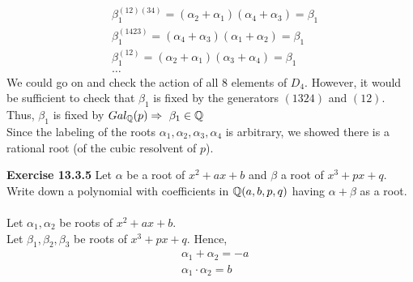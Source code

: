 \documentclass{article}
\begin{document}
\begin{homeworkProblem}
\begin{align}
    & \beta_1^{(12)(34)} = (\alpha_2+\alpha_1)(\alpha_4+\alpha_3) = \beta_1\\
    & \beta_1^{(1423)} = (\alpha_4+\alpha_3)(\alpha_1+\alpha_2)=\beta_1\\
    & \beta_1^{(12)} = (\alpha_2+\alpha_1)(\alpha_3+\alpha_4) = \beta_1\\
    & \ldots 
\end{align}
We could go on and check the action of all $8$ elements of $D_4$. However, it would be sufficient to check that $\beta_1$ is fixed by the generators $(1324)$ and $(12)$.\\
Thus, $\beta_1$ is fixed by $Gal_{\mathbb{Q}}(p) \Rightarrow \ \beta_1 \in \mathbb{Q}$\\
Since the labeling of the roots $\alpha_1,\alpha_2,\alpha_3, \alpha_4$ is arbitrary, we showed there is a rational root (of the cubic resolvent of $p$).


    
\end{homeworkProblem}

\pagebreak

\begin{homeworkProblem}
    \textbf{Exercise 13.3.5} Let $\alpha$ be a root of $x^2 + ax + b$ and $\beta$ a root of $x^3 + px + q$. 
    Write down a polynomial with coefficients in $\mathbb{Q}(a,b,p,q)$ having $\alpha + \beta$ as a root.\\
    \solution \\
    Let $\alpha_1, \alpha_2$ be roots of $x^2 + ax + b$.\\
    Let $\beta_1, \beta_2, \beta_3$ be roots of $x^3 + px + q$. Hence, 
    \begin{align}
        & \alpha_1 + \alpha_2 = -a\\
        & \alpha_1 \cdot \alpha_2 = b
    \end{align}
    

\end{homeworkProblem}

\pagebreak

\begin{homeworkProblem}

\end{homeworkProblem}
\end{document}
